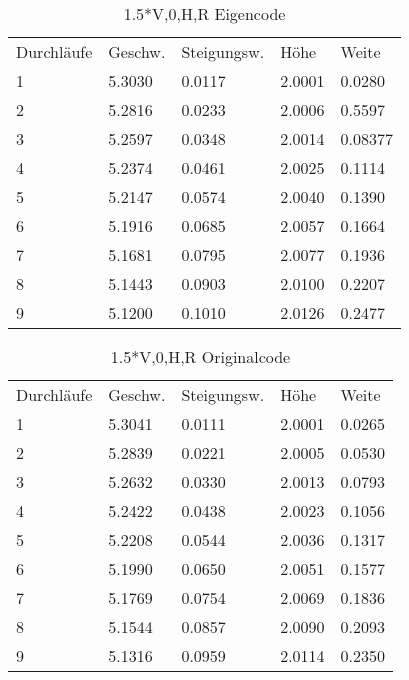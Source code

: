 \documentclass{article}
\begin{document}
\begin{table}
\centering
\caption{1.5*V,0,H,R Eigencode}
\begin{tabular}{lllll}
Durchläufe & Geschw. & Steigungsw. & Höhe   & Weite    \\
1          & 5.3030  & 0.0117      & 2.0001 & 0.0280   \\
2          & 5.2816  & 0.0233      & 2.0006 & 0.5597   \\
3          & 5.2597  & 0.0348      & 2.0014 & 0.08377  \\
4          & 5.2374  & 0.0461      & 2.0025 & 0.1114   \\
5          & 5.2147  & 0.0574      & 2.0040 & 0.1390   \\
6          & 5.1916  & 0.0685      & 2.0057 & 0.1664   \\
7          & 5.1681  & 0.0795      & 2.0077 & 0.1936   \\
8          & 5.1443  & 0.0903      & 2.0100 & 0.2207   \\
9          & 5.1200  & 0.1010      & 2.0126 & 0.2477  
\end{tabular}
\end{table}
\begin{table}
\centering
\caption{1.5*V,0,H,R Originalcode}
\begin{tabular}{lllll}
Durchläufe & Geschw. & Steigungsw. & Höhe    & Weite    \\
1          & 5.3041 & 0.0111     & 2.0001 & 0.0265  \\
2          & 5.2839 & 0.0221     & 2.0005 & 0.0530  \\
3          & 5.2632 & 0.0330     & 2.0013 & 0.0793  \\
4          & 5.2422 & 0.0438     & 2.0023 & 0.1056  \\
5          & 5.2208 & 0.0544     & 2.0036 & 0.1317  \\
6          & 5.1990 & 0.0650     & 2.0051 & 0.1577  \\
7          & 5.1769 & 0.0754     & 2.0069 & 0.1836  \\
8          & 5.1544 & 0.0857     & 2.0090 & 0.2093  \\
9          & 5.1316 & 0.0959     & 2.0114 & 0.2350 
\end{tabular}
\end{table}
\end{document}
